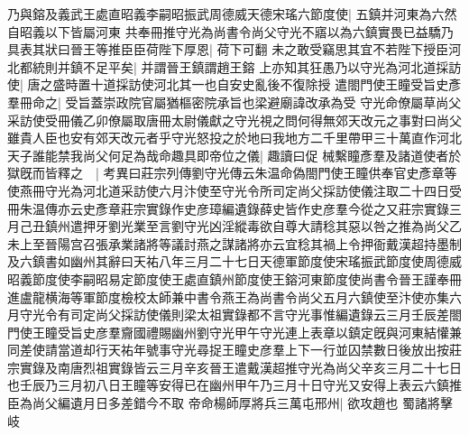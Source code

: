 乃與鎔及義武王處直昭義李嗣昭振武周德威天德宋瑤六節度使|{
	五鎮并河東為六然自昭義以下皆屬河東}
共奉冊推守光為尚書令尚父守光不寤以為六鎮實畏已益驕乃具表其狀曰晉王等推臣臣荷陛下厚恩|{
	荷下可翻}
未之敢受竊思其宜不若陛下授臣河北都統則并鎮不足平矣|{
	并謂晉王鎮謂趙王鎔}
上亦知其狂愚乃以守光為河北道採訪使|{
	唐之盛時置十道採訪使河北其一也自安史亂後不復除授}
遣閤門使王瞳受旨史彥羣冊命之|{
	受旨蓋崇政院官屬猶樞密院承旨也梁避廟諱改承為受}
守光命僚屬草尚父采訪使受冊儀乙卯僚屬取唐冊太尉儀獻之守光視之問何得無郊天改元之事對曰尚父雖貴人臣也安有郊天改元者乎守光怒投之於地曰我地方二千里帶甲三十萬直作河北天子誰能禁我尚父何足為哉命趣具即帝位之儀|{
	趣讀曰促}
械繫瞳彥羣及諸道使者於獄旣而皆釋之　|{
	考異曰莊宗列傳劉守光傳云朱温命偽閤門使王瞳供奉官史彥章等使燕冊守光為河北道采訪使六月汴使至守光令所司定尚父採訪使儀注取二十四日受冊朱温傳亦云史彥章莊宗實錄作史彦璋編遺錄薛史皆作史彦羣今從之又莊宗實錄三月己丑鎮州遣押牙劉光業至言劉守光凶淫縱毒欲自尊大請稔其惡以咎之推為尚父乙未上至晉陽宫召張承業諸將等議討燕之謀諸將亦云宜稔其禍上令押衙戴漢超持墨制及六鎮書如幽州其辭曰天祐八年三月二十七日天德軍節度使宋瑤振武節度使周德威昭義節度使李嗣昭易定節度使王處直鎮州節度使王鎔河東節度使尚書令晉王謹奉冊進盧龍横海等軍節度檢校太師兼中書令燕王為尚書令尚父五月六鎮使至汴使亦集六月守光令有司定尚父採訪使儀則梁太祖實錄都不言守光事惟編遺錄云三月壬辰差閤門使王瞳受旨史彦羣齎國禮賜幽州劉守光甲午守光連上表章以鎮定旣與河東結懽兼同差使請當道却行天祐年號事守光尋捉王瞳史彦羣上下一行並囚禁數日後放出按莊宗實錄及南唐烈祖實錄皆云三月辛亥晉王遣戴漢超推守光為尚父辛亥三月二十七日也壬辰乃三月初八日王瞳等安得已在幽州甲午乃三月十日守光又安得上表云六鎮推臣為尚父編遺月日多差錯今不取}
帝命楊師厚將兵三萬屯邢州|{
	欲攻趙也}
蜀諸將擊岐

